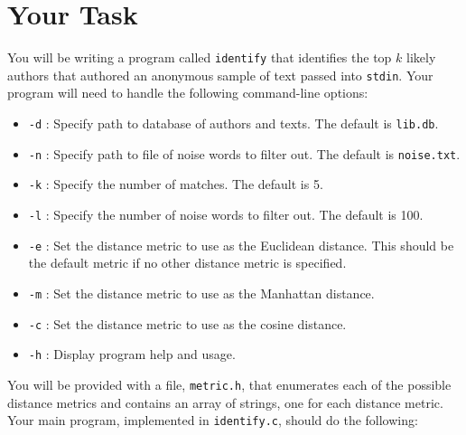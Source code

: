 \section{Your Task}\label{sec:task}

\noindent You will be writing a program called \texttt{identify} that
identifies the top $k$ likely authors that authored an anonymous sample of text
passed into \texttt{stdin}. Your program will need to handle the following
command-line options:

\begin{itemize}
  \item \texttt{-d} : Specify path to database of authors and texts. The
    default is \texttt{lib.db}.
  \item \texttt{-n} : Specify path to file of noise words to filter out. The
    default is \texttt{noise.txt}.
  \item \texttt{-k} : Specify the number of matches. The default is 5.
  \item \texttt{-l} : Specify the number of noise words to filter out. The
    default is 100.
  \item \texttt{-e} : Set the distance metric to use as the Euclidean distance.
    This should be the default metric if no other distance metric is specified.
  \item \texttt{-m} : Set the distance metric to use as the Manhattan distance.
  \item \texttt{-c} : Set the distance metric to use as the cosine distance.
  \item \texttt{-h} : Display program help and usage.
\end{itemize}

You will be provided with a file, \texttt{metric.h}, that enumerates each of the
possible distance metrics and contains an array of strings, one for each
distance metric. Your main program, implemented in \texttt{identify.c}, should
do the following:

